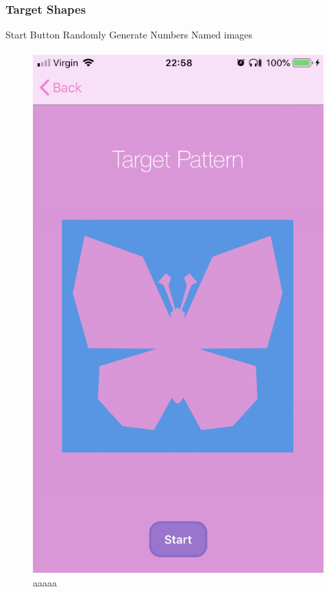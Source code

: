 \documentclass[11pt]{article}
\begin{document}
        \subsubsection{Target Shapes}
            
            Start Button
             Randomly Generate Numbers
             Named images

    
            \paragraph{}
            \begin{figure}[!ht]
                        \begin{minipage}{0.45\textwidth}
                            \centering \includegraphics[width=0.7\linewidth]{KiriZen/simpleTarget.png}
                            \caption{aaaaa}
                            \label{fig:kiriZen-simpleTarget}
                        \end{minipage}\hfill
                        \begin{minipage}{0.45\textwidth}

\end{minipage}
\end{figure}
\end{document}
